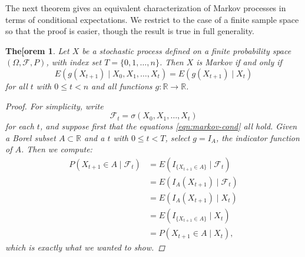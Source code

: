 \documentclass[11pt]{book}
\newtheorem{thm}{The[orem}[section]
\theoremstyle{definition}
\numberwithin{equation}{section}
\begin{document}
The next theorem gives an equivalent characterization of Markov processes in terms of conditional expectations. We restrict to the case of a finite sample space so that the proof is easier, though the result is true in full generality.

\begin{thm}
	Let $X$ be a stochastic process defined on a finite probability space $(\Omega, \mathcal{F}, P)$, with index set $T = \{0,1,\ldots,n\}$. Then $X$ is Markov if and only if
	\begin{equation}\label{eqn:markov-cond}
		E\left(g(X_{t+1}) \mid X_0, X_1,\ldots,X_t\right) = E \left( g(X_{t+1}) \mid X_t \right)
	\end{equation}
	for all $t$ with $0\leq t < n$ and all functions $g: \mathbb{R} \to \mathbb{R}$.
	\begin{proof}
		For simplicity, write
		\[
			\mathcal{F}_t = \sigma\left(X_0,X_1,\ldots,X_t \right)
		\]
		for each $t$, and suppose first that the equations \eqref{eqn:markov-cond} all hold. Given a Borel subset $A\subset \mathbb{R}$ and a $t$ with $0\leq t < T$, select $g=I_A$, the indicator function of $A$. Then we compute:
		\begin{align*}
			P\left(X_{t+1} \in A \mid \mathcal{F}_t\right) & = E\left( I_{\{X_{t+1} \in A\}} \mid \mathcal{F}_t \right) \\
			                                               & = E \left( I_A(X_{t+1}) \mid \mathcal{F}_t \right)         \\
			                                               & = E \left( I_A(X_{t+1}) \mid X_t \right)                   \\
			                                               & = E \left( I_{\{X_{t+1} \in A\}} \mid X_t \right)          \\
			                                               & = P\left(X_{t+1} \in A \mid X_t\right),
		\end{align*}
		which is exactly what we wanted to show.


\end{proof}
\end{thm}
\end{document}

